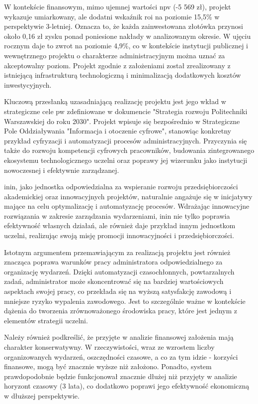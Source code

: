 W kontekście finansowym, mimo ujemnej wartości \gls{npv} (-5 569 zł), projekt wykazuje umiarkowany, ale dodatni wskaźnik \gls{roi} na poziomie 15,5\% w perspektywie 3-letniej. Oznacza to, że każda zainwestowana złotówka przynosi około 0,16 zł zysku ponad poniesione nakłady w analizowanym okresie. W ujęciu rocznym daje to zwrot na poziomie 4,9\%, co w kontekście instytucji publicznej i wewnętrznego projektu o charakterze administracyjnym można uznać za akceptowalny poziom. Projekt zgodnie z założeniami został zrealizowany z istniejącą infrastrukturą technologiczną i minimalizacją dodatkowych kosztów inwestycyjnych.

Kluczową przesłanką uzasadniającą realizację projektu jest jego wkład w strategiczne cele \gls{pw} zdefiniowane w dokumencie "Strategia rozwoju Politechniki Warszawskiej do roku 2030". Projekt wpisuje się bezpośrednio w Strategiczne Pole Oddziaływania "Informacja i otoczenie cyfrowe", stanowiąc konkretny przykład cyfryzacji i automatyzacji procesów administracyjnych. Przyczynia się także do rozwoju kompetencji cyfrowych pracowników, budowania zintegrowanego ekosystemu technologicznego uczelni oraz poprawy jej wizerunku jako instytucji nowoczesnej i efektywnie zarządzanej.

\gls{inin}, jako jednostka odpowiedzialna za wspieranie rozwoju przedsiębiorczości akademickiej oraz innowacyjnych projektów, naturalnie angażuje się w inicjatywy mające na celu optymalizację i automatyzację procesów. Wdrażając innowacyjne rozwiązania w zakresie zarządzania wydarzeniami, \gls{inin} nie tylko poprawia efektywność własnych działań, ale również daje przykład innym jednostkom uczelni, realizując swoją misję promocji innowacyjności i przedsiębiorczości.

Istotnym argumentem przemawiającym za realizacją projektu jest również znacząca poprawa warunków pracy administratora odpowiedzialnego za organizację wydarzeń. Dzięki automatyzacji czasochłonnych, powtarzalnych zadań, administrator może skoncentrować się na bardziej wartościowych aspektach swojej pracy, co przekłada się na wyższą satysfakcję zawodową i mniejsze ryzyko wypalenia zawodowego. Jest to szczególnie ważne w kontekście dążenia do tworzenia zrównoważonego środowiska pracy, które jest jednym z elementów strategii uczelni.

Należy również podkreślić, że przyjęte w analizie finansowej założenia mają charakter konserwatywny. W rzeczywistości, wraz ze wzrostem liczby organizowanych wydarzeń, oszczędności czasowe, a co za tym idzie - korzyści finansowe, mogą być znacznie wyższe niż założono. Ponadto, system prawdopodobnie będzie funkcjonował znacznie dłużej niż przyjęty w analizie horyzont czasowy (3 lata), co dodatkowo poprawi jego efektywność ekonomiczną w dłuższej perspektywie.

